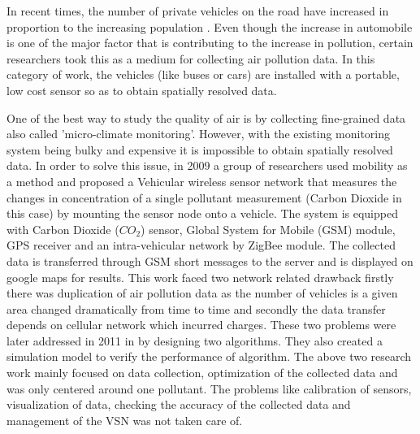 In recent times, the number of private vehicles on the road have increased in proportion to the increasing population \cite{Downs2004}. Even though the increase in automobile is one of the major factor that is contributing to the increase in pollution, certain researchers took this as a medium for collecting air pollution data. In this category of work, the vehicles (like buses or cars) are installed with a portable, low cost sensor so as to obtain spatially resolved data. 
\par
 One of the best way to study the quality of air is by collecting fine-grained data also called 'micro-climate monitoring'. However, with the existing monitoring system being bulky and expensive it is impossible to obtain spatially resolved data. In order to solve this issue, in 2009 a group of researchers used mobility as a method and proposed a Vehicular wireless sensor network \cite{Hu2009} that measures the changes in concentration of a single pollutant measurement (Carbon Dioxide in this case) by mounting the sensor node onto a vehicle. The system is equipped with Carbon Dioxide ($CO_2$) sensor, Global System for Mobile (GSM) module, GPS receiver and  an intra-vehicular network by ZigBee module. The collected data is transferred through GSM short messages to the server and is displayed on google maps for results. This work faced two network related drawback firstly there was duplication of air pollution data as the number of vehicles is a given area changed dramatically from time to time and secondly the data transfer depends on cellular network which incurred charges. These two problems were later addressed in 2011 in \cite{Hu2011} by designing two algorithms. They also created a simulation model to verify the performance of algorithm. The above two research work mainly focused on data collection, optimization of the collected data and was only centered around one pollutant. The problems like calibration of sensors, visualization of data, checking the accuracy of the collected data and management of the VSN was not taken care of.
\par

